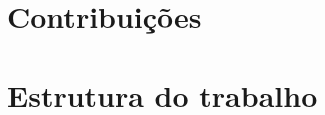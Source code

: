 \section{Contribui\c{c}\~oes}
\label{sec:contribuicoes}

%
%

\section{Estrutura do trabalho}
\label{sec:estrutura}

%
